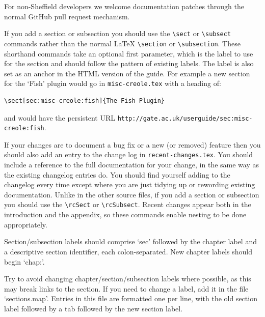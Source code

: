 For non-Sheffield developers we welcome documentation patches through the
normal GitHub pull request mechanism.

If you add a section or subsection you should use the \verb|\sect| or
\verb|\subsect| commands rather than the normal LaTeX \verb|\section| or
\verb|\subsection|.  These shorthand commands take an optional first parameter,
which is the label to use for the section and should follow the pattern of
existing labels.  The label is also set as an anchor in the HTML version of
the guide.  For example a new section for the `Fish' plugin would go in
\verb|misc-creole.tex| with a heading of:
\begin{small}\begin{verbatim}
\sect[sec:misc-creole:fish]{The Fish Plugin}
\end{verbatim}\end{small}
and would have the persistent URL
\verb|http://gate.ac.uk/userguide/sec:misc-creole:fish|.

If your changes are to document a bug fix or a new (or removed) feature then you
should also add an entry to the change log in \verb|recent-changes.tex|. You
should include a reference to the full documentation for your change, in the same
way as the existing changelog entries do. You should find yourself adding to the
changelog every time except where you are just tidying up or rewording existing
documentation. Unlike in the other source files, if you add a section or
subsection you should use the \verb|\rcSect| or \verb|\rcSubsect|. Recent
changes appear both in the introduction and the appendix, so these commands
enable nesting to be done appropriately.

Section/subsection labels should comprise `sec' followed by the chapter label and
a descriptive section identifier, each colon-separated. New chapter labels should
begin `chap:'.

Try to avoid changing chapter/section/subsection labels where possible, as this
may break links to the section. If you need to change a label, add it in the
file `sections.map'. Entries in this file are formatted one per line, with the
old section label followed by a tab followed by the new section label.


